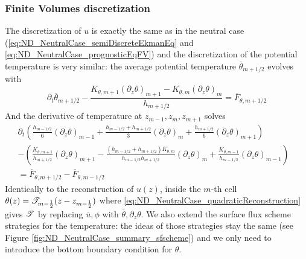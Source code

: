 \subsubsection{Finite Volumes discretization}
\label{sec:ND_StratifiedCase_FVDis}
The discretization of $u$ is exactly the same as in the
neutral case (\eqref{eq:ND_NeutralCase_semiDiscreteEkmanEq} and \eqref{eq:ND_NeutralCase_prognosticEqFV}) and the discretization of 
the potential temperature is very similar:
the average potential temperature $\overline{\theta}_{m+1/2}$
evolves with
\begin{equation}
\label{eq:ND_StratifiedCase_semiDiscreteEkmanEqPT}
    \partial_t \overline{\theta}_{m+1/2}
    - \frac{K_{\theta, m+1} {(\partial_z \theta)}_{m+1} - K_{\theta, m} {(\partial_z \theta)}_m}{h_{m+1/2}}
	= \overline{F}_{\theta, m+1/2}
\end{equation}
And the derivative of temperature at $z_{m-1}, z_m, z_{m+1}$ solves
\begin{equation}
\begin{aligned}
\label{eq:ND_StratifiedCase_prognosticPT_FV}
\partial_t \left( \frac{h_{m-1/2}}{6} {(\partial_z \theta)}_{m-1}
+ \frac{h_{m-1/2} + h_{m+1/2}}{3} {(\partial_z \theta)}_m
	+ \frac{h_{m+1/2}}{6} {(\partial_z \theta)}_{m+1} \right)
	~~~~~~~~~~& \\
	-
    \left(
	\frac{K_{\theta, m+1}}{ h_{m+1/2}}{(\partial_z \theta)}_{m+1}
	- \frac{(h_{m-1/2} + h_{m+1/2}) K_{\theta, m}}{h_{m-1/2} h _{m+1/2}}
	{(\partial_z \theta)}_m + \frac{K_{\theta, m-1}}{ h_{m-1/2}}{(\partial_z \theta)}_{m-1}
	\right)&\\
	= \overline{F}_{\theta, m+1/2} - \overline{F}_{\theta, m-1/2}&
\end{aligned}
\end{equation}
Identically to the reconstruction of $u(z)$,
inside the $m$-th cell
$\theta(z) = {\cal T}_{m-\frac{1}{2}}(z-z_{m-\frac{1}{2}})$
where \eqref{eq:ND_NeutralCase_quadraticReconstruction}
gives ${\cal T}$ by replacing $\overline{u}, \phi$
with $\overline{\theta}, \partial_z \theta$.
We also extend the surface flux scheme strategies for the temperature:
the ideas of those strategies stay the same
(see Figure \ref{fig:ND_NeutralCase_summary_sfscheme}) and we only
need to introduce the bottom boundary condition for $\theta$.
